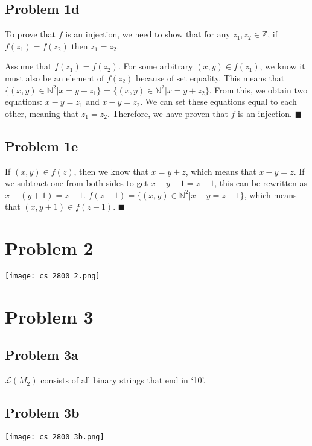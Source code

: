 \documentclass{article}
\begin{document}
\subsection{Problem 1d}

To prove that $f$ is an injection, we need to show that for any $z_1, z_2 \in \mathbb{Z}$, if $f(z_1) = f(z_2)$ then $z_1 = z_2$.

Assume that $f(z_1) = f(z_2)$. For some arbitrary $(x, y) \in f(z_1)$, we know it must also be an element of $f(z_2)$ because of set equality. This means that $\{(x, y) \in \mathbb{N}^2 | x = y + z_1\}$ = $\{(x, y) \in \mathbb{N}^2 | x = y + z_2\}$. From this, we obtain two equations: $x - y = z_1$ and $x - y = z_2$. We can set these equations equal to each other, meaning that $z_1 = z_2$. Therefore, we have proven that $f$ is an injection. $\blacksquare$

\subsection{Problem 1e}

If $(x, y) \in f(z)$, then we know that $x = y + z$, which means that $x - y = z$. If we subtract one from both sides to get $x - y - 1 = z - 1$, this can be rewritten as $x - (y + 1) = z - 1$. $f(z - 1) = \{(x, y) \in \mathbb{N}^2 | x - y = z - 1\}$, which means that $(x, y + 1) \in f(z - 1)$. $\blacksquare$

\section{Problem 2}

\begin{center}
\texttt{[image: cs 2800 2.png]}
\end{center}

\section{Problem 3}

\subsection{Problem 3a}

$\mathcal{L}(M_2)$ consists of all binary strings that end in ‘10’.

\subsection{Problem 3b}

\begin{center}
\texttt{[image: cs 2800 3b.png]}
\end{center}
\end{document}
